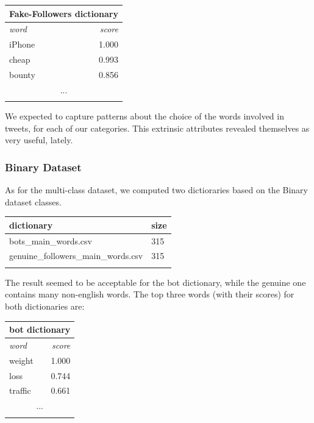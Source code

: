 \normalsize
\small
\begin{center}
	\begin{tabular}{lllll}
		\multicolumn{5}{c}{\textbf{Fake-Followers dictionary}} \\
		\hline\hline
		\multicolumn{4}{l}{\textit{word}} & 
		\multicolumn{1}{r}{\textit{score}}\\
		\hline\hline
		\multicolumn{4}{l}{iPhone} & 
		\multicolumn{1}{r}{1.000}\\
		\multicolumn{4}{l}{cheap} & 
		\multicolumn{1}{r}{0.993}\\
		\multicolumn{4}{l}{bounty} & 
		\multicolumn{1}{r}{0.856}\\
		\multicolumn{5}{c}{...} \\
		\hline\\
	\end{tabular}
\end{center}
\normalsize

We expected to capture patterns about the choice of the words involved in tweets, for each of our categories.
This extrinsic attributes revealed themselves as very useful, lately.

\subsubsection{Binary Dataset}
As for the multi-class dataset, we computed two dictioraries based on the Binary dataset classes.

\small
\begin{center}
	\begin{tabular}{ll}
		\\dictionary&size\\
		\hline\hline
		bots\_main\_words.csv&315\\
		genuine\_followers\_main\_words.csv&315\\\hline\\
	\end{tabular}
\end{center}
\normalsize

The result seemed to be acceptable for the bot dictionary, while the genuine one contains many non-english words. The top three words (with their scores) for both dictionaries are:

\small
\begin{center}
	\begin{tabular}{lllll}
		\multicolumn{5}{c}{\textbf{bot dictionary}} \\
		\hline\hline
		\multicolumn{4}{l}{\textit{word}} & 
		\multicolumn{1}{r}{\textit{score}}\\
		\hline\hline
		\multicolumn{4}{l}{weight} & 
		\multicolumn{1}{r}{1.000}\\
		\multicolumn{4}{l}{loss} & 
		\multicolumn{1}{r}{0.744}\\
		\multicolumn{4}{l}{traffic} & 
		\multicolumn{1}{r}{0.661}\\
		\multicolumn{5}{c}{...} \\
		\hline\\
	\end{tabular}
\end{center}
\normalsize

